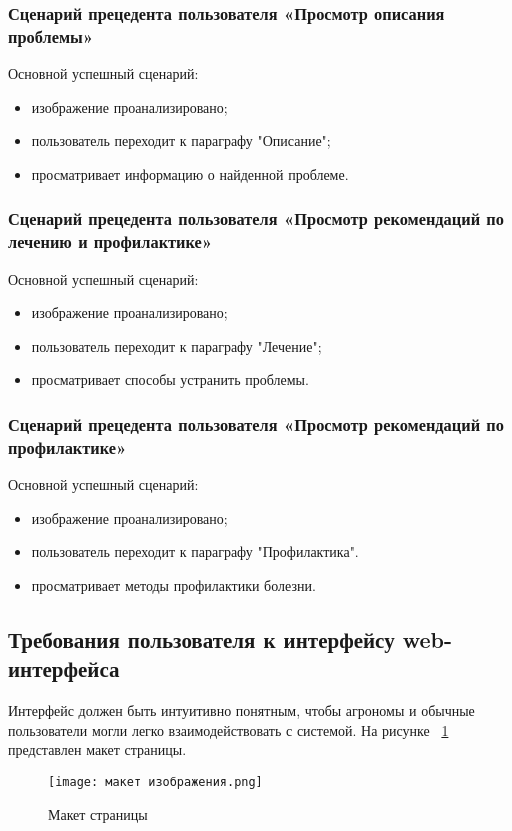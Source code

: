 \subsubsection{Сценарий прецедента пользователя «Просмотр описания проблемы»}
Основной успешный сценарий:
\begin{itemize}
	\item изображение проанализировано;
	\item пользователь переходит к параграфу "Описание";
	\item просматривает информацию о найденной проблеме.
\end{itemize}

\subsubsection{Сценарий прецедента пользователя «Просмотр рекомендаций по лечению и профилактике»}
Основной успешный сценарий:
\begin{itemize}
	\item изображение проанализировано;
	\item пользователь переходит к параграфу "Лечение";
	\item просматривает способы устранить проблемы.
\end{itemize}

\subsubsection{Сценарий прецедента пользователя «Просмотр рекомендаций по профилактике»}
Основной успешный сценарий:
\begin{itemize}
	\item изображение проанализировано;
	\item пользователь переходит к параграфу "Профилактика".
	\item просматривает методы профилактики болезни.
\end{itemize}

\subsection{Требования пользователя к интерфейсу web-интерфейса}
Интерфейс должен быть интуитивно понятным, чтобы агрономы и обычные пользователи могли легко взаимодействовать с системой.
На рисунке ~\ref{maksite1:image} представлен макет страницы.

\begin{figure}[H]
	\centering
	\texttt{[image: макет изображения.png]}
	\caption{Макет страницы}
	\label{maksite1:image}
\end{figure}

